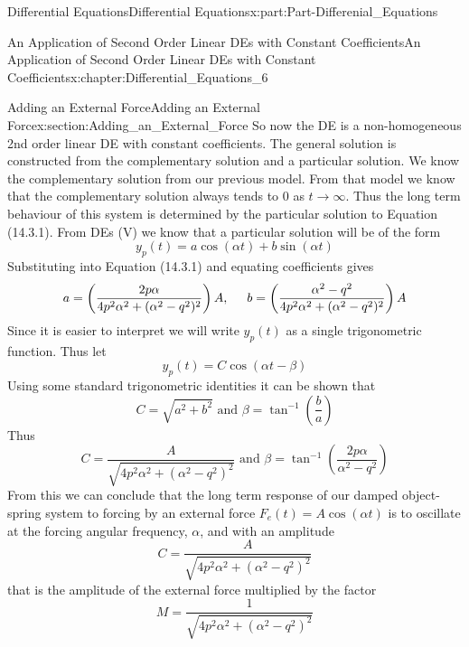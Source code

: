 \documentclass[oneside,10pt,]{book}
\numberwithin{equation}{section}
\begin{document}
\begin{partptx}{Differential Equations}{}{Differential Equations}{}{}{x:part:Part-Differenial_Equations}
\begin{chapterptx}{An Application of Second Order Linear DEs with Constant Coefficients}{}{An Application of Second Order Linear DEs with Constant Coefficients}{}{}{x:chapter:Differential_Equations_6}
\begin{sectionptx}{Adding an External Force}{}{Adding an External Force}{}{}{x:section:Adding_an_External_Force}
So now the DE is a non-homogeneous 2nd order linear DE with constant coefficients. The general solution is constructed from the complementary solution and a particular solution. We know the complementary solution from our previous model. From that model we know that the complementary solution always tends to \(0\) as \(t\rightarrow\infty\). Thus the long term behaviour of this system is determined by the particular solution to Equation (14.3.1). From DEs (V) we know that a particular solution will be of the form%
\begin{equation*}
y_p(t)=a\cos(\alpha t)+b\sin(\alpha t)
\end{equation*}
Substituting into Equation (14.3.1) and equating coefficients gives%
\begin{equation*}
a=\left(\frac{2p\alpha}{4p^2\alpha^2+(\alpha^2-q^2)^2}\right)A, \hspace{5mm} b=\left(\frac{\alpha^2-q^2}{4p^2\alpha^2+(\alpha^2-q^2)^2}\right)A
\end{equation*}
Since it is easier to interpret we will write \(y_p(t)\) as a single trigonometric function. Thus let%
\begin{equation*}
y_p(t)=C\cos(\alpha t-\beta)
\end{equation*}
Using some standard trigonometric identities it can be shown that%
\begin{equation*}
C=\sqrt{a^2+b^2} \textrm{ and } \beta=\tan^{-1}\left(\frac{b}{a}\right)
\end{equation*}
Thus%
\begin{equation*}
C=\frac{A}{\sqrt{4p^2\alpha^2+(\alpha^2-q^2)^2}} \textrm{ and } \beta=\tan^{-1}\left(\frac{2p\alpha}{\alpha^2-q^2}\right)
\end{equation*}
From this we can conclude that the long term response of our damped object-spring system to forcing by an external force \(F_e(t)=A\cos(\alpha t)\) is to oscillate at the forcing angular frequency, \(\alpha\), and with an amplitude%
\begin{equation*}
C=\frac{A}{\sqrt{4p^2\alpha^2+(\alpha^2-q^2)^2}}
\end{equation*}
that is the amplitude of the external force multiplied by the factor%
\begin{equation*}
M=\frac{1}{\sqrt{4p^2\alpha^2+(\alpha^2-q^2)^2}}
\end{equation*}

\end{sectionptx}
\end{chapterptx}
\end{partptx}
\end{document}
